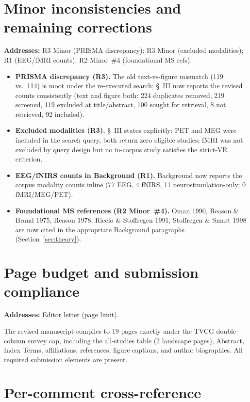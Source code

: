 \documentclass[11pt,a4paper]{article}
\newcommand{\addresses}[1]{\par\noindent\textbf{\small Addresses:} {\small #1}\par\smallskip}
\begin{document}
\section{Minor inconsistencies and remaining corrections}\label{sec:minor}
\addresses{R3 Minor (PRISMA discrepancy); R3 Minor (excluded modalities); R1 (EEG/fMRI counts); R2 Minor~\#4 (foundational MS refs).}

\begin{itemize}
  \item \textbf{PRISMA discrepancy (R3).} The old text-vs-figure mismatch (119 vs.\ 114) is moot under the re-executed search; \S~III now reports the revised counts consistently (text and figure both: 224 duplicates removed, 219 screened, 119 excluded at title/abstract, 100 sought for retrieval, 8 not retrieved, 92 included).
  \item \textbf{Excluded modalities (R3).} \S~III states explicitly: PET and MEG were included in the search query, both return zero eligible studies; fMRI was not excluded by query design but no in-corpus study satisfies the strict-VR criterion.
  \item \textbf{EEG/fNIRS counts in Background (R1).} Background now reports the corpus modality counts inline (77 EEG, 4 fNIRS, 11 neurostimulation-only; 0 fMRI/MEG/PET).
  \item \textbf{Foundational MS references (R2 Minor~\#4).} Oman 1990, Reason \& Brand 1975, Reason 1978, Riccio \& Stoffregen 1991, Stoffregen \& Smart 1998 are now cited in the appropriate Background paragraphs (Section~\ref{sec:theory}).
\end{itemize}

\section{Page budget and submission compliance}\label{sec:budget}
\addresses{Editor letter (page limit).}

The revised manuscript compiles to 19 pages exactly under the TVCG double-column survey cap, including the all-studies table (2 landscape pages), Abstract, Index Terms, affiliations, references, figure captions, and author biographies. All required submission elements are present.

\section{Per-comment cross-reference}\label{sec:xref}
\end{document}

